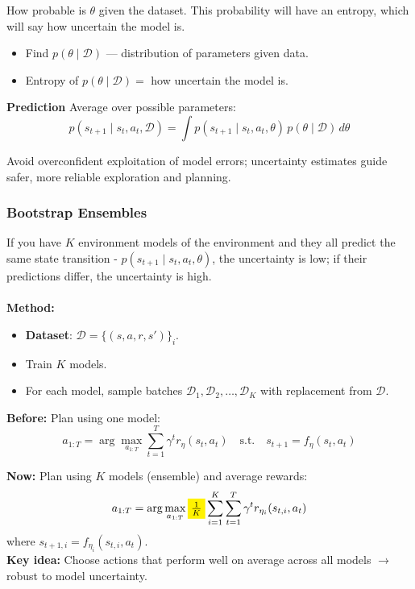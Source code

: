 \documentclass[12pt]{article}
\begin{document}
How probable is $\theta$ given the dataset. This probability will have an entropy, which will say how uncertain the model is. 
\begin{itemize}
    \item Find $p(\theta \mid \mathcal{D})$ — distribution of parameters given data.
    \item Entropy of $p(\theta \mid \mathcal{D}) = $ how uncertain the model is.
\end{itemize}

\textbf{Prediction}
Average over possible parameters:
$$
p(s_{t+1} \mid s_t, a_t, \mathcal{D}) = \int p(s_{t+1} \mid s_t, a_t, \theta) \, p(\theta \mid \mathcal{D}) \, d\theta
$$

Avoid overconfident exploitation of model errors; uncertainty estimates guide safer, more reliable exploration and planning.

\subsubsection{Bootstrap Ensembles}
If you have $K$ environment models of the environment and they all predict the same state transition - $p(s_{t+1} \mid s_t, a_t, \theta)$, the uncertainty is low; if their predictions differ, the uncertainty is high.\\ \\
\textbf{Method:}
\begin{itemize}
    \item \textbf{Dataset}: $\mathcal{D} = \{(s,a,r,s')\}_i$.
    \item Train $K$ models.
    \item For each model, sample batches $\mathcal{D}_1, \mathcal{D}_2, \dots, \mathcal{D}_K$ with replacement from $\mathcal{D}$.
\end{itemize}

\textbf{Before:} Plan using one model:
$$
a_{1:T} = \arg\max_{a_{1:T}} \sum_{t=1}^T \gamma^t r_\eta(s_t,a_t) \quad \text{s.t.} \quad s_{t+1} = f_\eta(s_t,a_t)
$$

\textbf{Now:} Plan using $K$ models (ensemble) and average rewards:
$$
a_{1:T} = \arg\max_{a_{1:T}} \colorbox{yellow}{$\frac{1}{K}$} \sum_{i=1}^K \sum_{t=1}^T \gamma^t r_{\eta_i}(s_{t,i},a_t)
$$
where $s_{t+1,i} = f_{\eta_i}(s_{t,i},a_t)$.\\

\textbf{Key idea:} Choose actions that perform well on average across all models $\rightarrow$ robust to model uncertainty.\\
\end{document}
